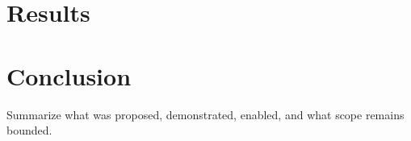 \documentclass[conference]{IEEEtran}
\begin{document}
\section{Results}
\label{sec:results}



\section{Conclusion}
\label{sec:conclusion}

Summarize what was proposed, demonstrated, enabled, and what scope remains bounded.

\begingroup
\makeatletter
\let\oldthebibliography\thebibliography
\let\endoldthebibliography\endthebibliography
\renewenvironment{thebibliography}[1]{%
    \oldthebibliography{#1}%
    \fontsize{7}{7.15}\selectfont
    \setlength{\itemsep}{0pt}%
    \setlength{\parskip}{0pt}%
}{\endoldthebibliography}
\makeatother


\endgroup
\end{document}
